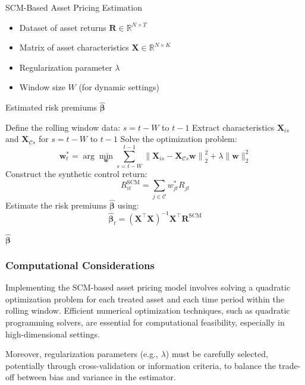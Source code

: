 \begin{algorithm}[H]
\caption{SCM-Based Asset Pricing Estimation}
\label{alg:SCM_Ap}
\begin{algorithmic}[1]
\REQUIRE
\begin{itemize}
    \item Dataset of asset returns $\mathbf{R} \in \mathbb{R}^{N \times T}$
    \item Matrix of asset characteristics $\mathbf{X} \in \mathbb{R}^{N \times K}$
    \item Regularization parameter $\lambda$
    \item Window size $W$ (for dynamic settings)
\end{itemize}
\ENSURE Estimated risk premiums $\hat{\boldsymbol{\beta}}$

        \STATE Define the rolling window data: $s = t-W$ to $t-1$
        \STATE Extract characteristics $\mathbf{X}_{is}$ and $\mathbf{X}_{\mathcal{C}s}$ for $s = t-W$ to $t-1$
        \STATE Solve the optimization problem:
        \[
        \mathbf{w}_t^* = \arg\min_{\mathbf{w}} \sum_{s = t-W}^{t-1} \left\| \mathbf{X}_{is} - \mathbf{X}_{\mathcal{C}s} \mathbf{w} \right\|_2^2 + \lambda \|\mathbf{w}\|_2^2
        \]
        \STATE Construct the synthetic control return:
        \[
        R_{it}^{\text{SCM}} = \sum_{j \in \mathcal{C}} w_{jt}^* R_{jt}
        \]
        \STATE Estimate the risk premiums $\hat{\boldsymbol{\beta}}$ using:
        \[
        \hat{\boldsymbol{\beta}}_t = \left( \mathbf{X}^\top \mathbf{X} \right)^{-1} \mathbf{X}^\top \mathbf{R}^{\text{SCM}}
        \]
    \ENDFOR
\ENDFOR

\RETURN $\hat{\boldsymbol{\beta}}$
\end{algorithmic}
\end{algorithm}

\subsubsection{Computational Considerations}

Implementing the SCM-based asset pricing model involves solving a quadratic optimization problem for each treated asset and each time period within the rolling window. Efficient numerical optimization techniques, such as quadratic programming solvers, are essential for computational feasibility, especially in high-dimensional settings.

Moreover, regularization parameters (e.g., $\lambda$) must be carefully selected, potentially through cross-validation or information criteria, to balance the trade-off between bias and variance in the estimator.

